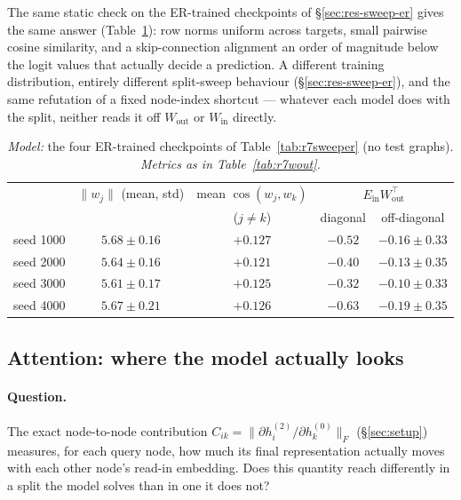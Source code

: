 \documentclass[11pt,a4paper]{article}
\begin{document}
The same static check on the ER-trained checkpoints of \S\ref{sec:res-sweep-er} gives the
same answer (Table~\ref{tab:r7wouter}): row norms uniform across targets, small pairwise
cosine similarity, and a skip-connection alignment an order of magnitude below the logit
values that actually decide a prediction. A different training distribution, entirely
different split-sweep behaviour (\S\ref{sec:res-sweep-er}), and the same refutation of a
fixed node-index shortcut --- whatever each model does with the split, neither reads it off
$W_{\mathrm{out}}$ or $W_{\mathrm{in}}$ directly.

\begin{table}[H]\centering\small
\begin{tabular}{lcccc}
\toprule
 & $\|w_j\|$ (mean, std) & mean $\cos(w_j,w_k)$ & \multicolumn{2}{c}{$E_{\mathrm{in}}W_{\mathrm{out}}^\top$}\\
 & & ($j\neq k$) & diagonal & off-diagonal\\
\midrule
seed 1000 & $5.68\pm0.16$ & $+0.127$ & $-0.52$ & $-0.16\pm0.33$\\
seed 2000 & $5.64\pm0.16$ & $+0.121$ & $-0.40$ & $-0.13\pm0.35$\\
seed 3000 & $5.61\pm0.17$ & $+0.125$ & $-0.32$ & $-0.10\pm0.33$\\
seed 4000 & $5.67\pm0.21$ & $+0.126$ & $-0.63$ & $-0.19\pm0.35$\\
\bottomrule\end{tabular}
\caption{\emph{Model:} the four ER-trained checkpoints of Table~\ref{tab:r7sweeper} (no test
graphs). \emph{Metrics as in Table~\ref{tab:r7wout}.}}
\label{tab:r7wouter}
\end{table}

\subsection{Attention: where the model actually looks}
\label{sec:res-attention}

\paragraph{Question.} The exact node-to-node contribution $C_{ik}=\|\partial
h_i^{(2)}/\partial h_k^{(0)}\|_F$ (\S\ref{sec:setup}) measures, for each query
node, how much its final representation actually moves with each other node's
read-in embedding. Does this quantity reach differently in a split the model
solves than in one it does not?
\end{document}
